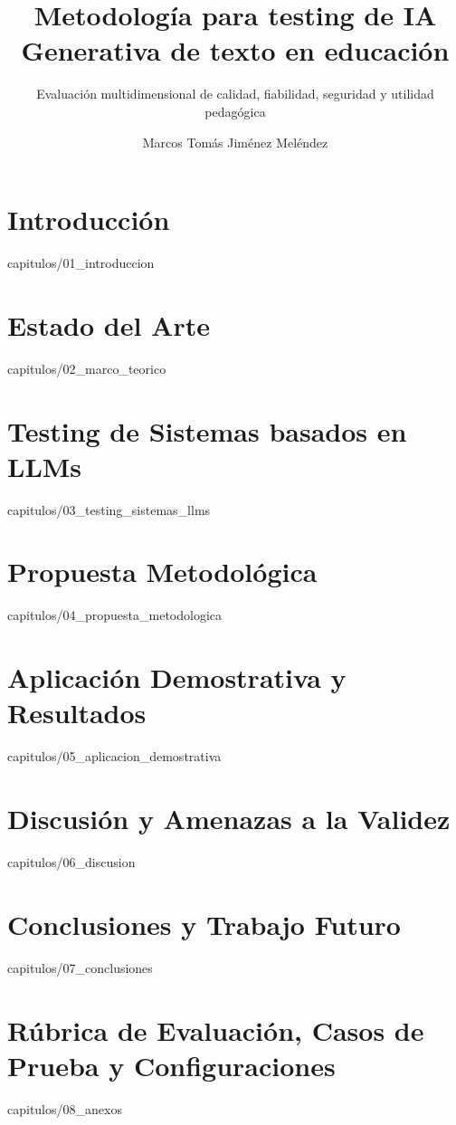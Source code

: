 \documentclass[epsbased,copyright,final,printable,covers,firstnumbered,tfg,lof,lot,loe]{tfgtfmthesisuam}
\title{Metodología para testing de IA Generativa de texto en educación}
\subtitle{Evaluación multidimensional de calidad, fiabilidad, seguridad y utilidad pedagógica}
\author{Marcos Tomás Jiménez Meléndez}
\begin{document}
\chapter{Introducción\label{CAP:INTRODUCCION}}{capitulos/01_introduccion}
\chapter{Estado del Arte\label{CAP:ESTADODELARTE}}{capitulos/02_marco_teorico}
\chapter{Testing de Sistemas basados en LLMs\label{CAP:TESTINGLLMS}}{capitulos/03_testing_sistemas_llms}
\chapter{Propuesta Metodológica\label{CAP:METODOLOGIA}}{capitulos/04_propuesta_metodologica}
\chapter{Aplicación Demostrativa y Resultados\label{CAP:EXPERIMENTACION}}{capitulos/05_aplicacion_demostrativa}
\chapter{Discusión y Amenazas a la Validez\label{CAP:DISCUSION}}{capitulos/06_discusion}
\chapter{Conclusiones y Trabajo Futuro\label{CAP:CONCLUSIONES}}{capitulos/07_conclusiones}

\appendix

\chapter{Rúbrica de Evaluación, Casos de Prueba y Configuraciones\label{CAP:ANEXOS}}{capitulos/08_anexos}
\end{document}
